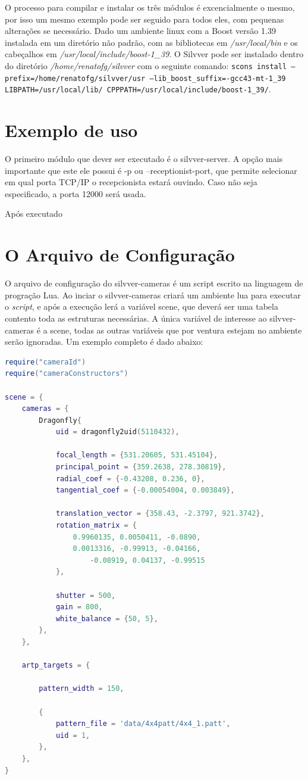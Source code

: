 \documentclass[a4paper,10pt]{article}
\begin{document}
O processo para compilar e instalar os três módulos é excencialmente o mesmo,
por isso um mesmo exemplo pode ser seguido para todos eles, com pequenas
alterações se necessário. Dado um ambiente linux com a Boost versão 1.39
instalada em um diretório não padrão, com as bibliotecas em
\emph{/usr/local/bin} e os cabeçalhos em
\emph{/usr/local/include/boost-1\_39}. O Silvver pode ser instalado dentro do
diretório \emph{/home/renatofg/silvver} com o seguinte comando: \texttt{scons
  install --prefix=/home/renatofg/silvver/usr --lib\_boost\_suffix=-gcc43-mt-1\_39
  LIBPATH=/usr/local/lib/ CPPPATH=/usr/local/include/boost-1\_39/}.

\section{Exemplo de uso}

O primeiro módulo que dever ser executado é o silvver-server. A opção mais
importante que este ele possui é -p ou --receptionist-port, que permite
selecionar em qual porta TCP/IP o recepcionista estará ouvindo. Caso não seja
especificado, a porta 12000 será usada.

Após executado 

\section{O Arquivo de Configuração}

O arquivo de configuração do silvver-cameras é um script escrito na
linguagem de progração Lua\cite{lua}. Ao inciar o silvver-cameras criará um
ambiente lua para executar o \emph{script}, e após a execução lerá a variável
scene, que deverá ser uma tabela contento toda as estruturas necessárias.
A única variável de interesse ao silvver-cameras é a scene, todas as outras
variáveis que por ventura estejam no ambiente serão ignoradas.  Um exemplo
completo é dado abaixo:

\begin{lstlisting}[frame=lines,language=lua]
require("cameraId")
require("cameraConstructors")

scene = {
    cameras = {
        Dragonfly{
            uid = dragonfly2uid(5110432),

            focal_length = {531.20605, 531.45104},
            principal_point = {359.2638, 278.30819},
            radial_coef = {-0.43208, 0.236, 0},
            tangential_coef = {-0.00054004, 0.003849},

            translation_vector = {358.43, -2.3797, 921.3742},
            rotation_matrix = {
                0.9960135, 0.0050411, -0.0890,
                0.0013316, -0.99913, -0.04166,
                    -0.08919, 0.04137, -0.99515
            },

            shutter = 500,
            gain = 800,
            white_balance = {50, 5},
        },
    },

    artp_targets = {

        pattern_width = 150,

        {
            pattern_file = 'data/4x4patt/4x4_1.patt',
            uid = 1,
        },
    },
}
\end{lstlisting}
\end{document}
